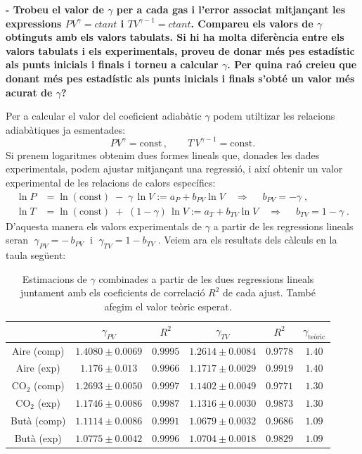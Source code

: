 \documentclass[a4paper,twoside,12pt]{article}
\theoremstyle{definition}
\begin{document}
	
	
	
	
	
	
	
	
	\newpage
	
	\textbf{- Trobeu el valor de $\gamma$ per a cada gas i l’error associat mitjançant les expressions $PV^{\gamma} = ctant$ i $TV^{\gamma-1} = ctant$.
		Compareu els valors de $\gamma$ obtinguts amb els valors tabulats. Si hi ha molta diferència entre
		els valors tabulats i els experimentals, proveu de donar més pes estadístic als punts inicials
		i finals i torneu a calcular $\gamma$. Per quina raó creieu que donant més pes estadístic als punts inicials i finals s’obté un valor
		més acurat de $\gamma$?}
		
	Per a calcular el valor del coeficient adiabàtic $\gamma$ podem utiltizar les relacions adiabàtiques ja esmentades: 
	\[
	PV^{\gamma}=\text{const}\,, \qquad T\,V^{\gamma-1}=\text{const}.
	\]
	Si prenem logaritmes obtenim dues formes lineals que, donades les dades experimentals, podem ajustar mitjançant una regressió, i així obtenir un valor experimental de les relacions de calors específics:
	\begin{align}
		\label{eq:ajustPV}
		\ln P &= \ln(\text{const})\;-\;\gamma\,\ln V := a_P + b_{PV}\ln  V
		\quad\Longrightarrow\quad
		\; b_{PV} = -\gamma\;,
		\\
		\label{eq:ajustTV}
		\ln T &= \ln(\text{const})\;+\;(1-\gamma)\,\ln V := a_T + b_{TV}\ln V
		\quad\Longrightarrow\quad
		\; b_{TV} = 1-\gamma\;.
	\end{align}
	D'aquesta manera els valors experimentals de $\gamma$ a partir de les regressions lineals seran
	$
	\;\gamma_{PV} = -\,b_{PV}\; 
	$ i 
	$\;\gamma_{TV} = 1 - b_{TV}\;$. Veiem ara els resultats dels càlculs en la taula següent:
	
\begin{table}[h]
	\centering
	\caption{Estimacions de $\gamma$ combinades a partir de les dues regressions lineals juntament amb els coeficients de correlació $R^2$ de cada ajust. També afegim el valor teòric esperat.}
	\begin{tabular}{|c|cc|cc|c|}
		\hline
		& $\gamma_{PV}$ & $R^2$ & $\gamma_{TV}$ & $R^2$ & $\gamma_{\text{teòric}}$ \\
		\hline
		Aire (comp)  & $1.4080 \pm 0.0069$ & $0.9995$ & $1.2614 \pm 0.0084$ & $0.9778$ & $1.40$ \\
		Aire (exp)   & $1.176 \pm 0.013$ & $0.9966$ & $1.1717 \pm 0.0029$ & $0.9919$ & $1.40$ \\ \hline
		CO$_2$ (comp) & $1.2693 \pm 0.0050$ & $0.9997$ & $1.1402 \pm 0.0049$ & $0.9771$ & $1.30$ \\
		CO$_2$ (exp)  & $1.1746 \pm 0.0086$ & $0.9987$ & $1.1316 \pm 0.0030$ & $0.9873$ & $1.30$ \\ \hline
		Butà (comp)  & $1.1114 \pm 0.0086$ & $0.9991$ & $1.0679 \pm 0.0032$ & $0.9686$ & $1.09$ \\
		Butà (exp)   & $1.0775 \pm 0.0042$ & $0.9996$ & $1.0704 \pm 0.0018$ & $0.9829$ & $1.09$ \\
		\hline
	\end{tabular}
	\label{tab:gamma_combined}
\end{table}
\end{document}
